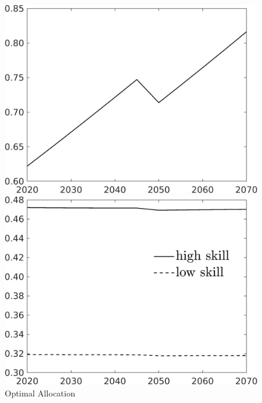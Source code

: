 \begin{figure}[h!!]
	\centering
	\caption{Optimal Allocation }\label{fig:optAll}
	
	
	\begin{minipage}[]{0.32\textwidth}
		\includegraphics[width=1\textwidth]{../../codding_model/own_basedOnFried/optimalPol_010922_revision/figures/all_13Sept22_Tplus30/Single_OPT_T_NoTaus_C_regime0_spillover0_knspil0_noskill0_sep0_xgrowth0_extern0_PV1_sizeequ0_GOV0_etaa0.79.png}
	\end{minipage}
	\begin{minipage}[]{0.32\textwidth}
		\includegraphics[width=1\textwidth]{../../codding_model/own_basedOnFried/optimalPol_010922_revision/figures/all_13Sept22_Tplus30/SingleJointTOT_regime0_OPT_T_NoTaus_Labour_spillover0_knspil0_noskill0_sep0_xgrowth0_extern0_PV1_etaa0.79_lgd1.png}

\end{minipage}
\end{figure}
